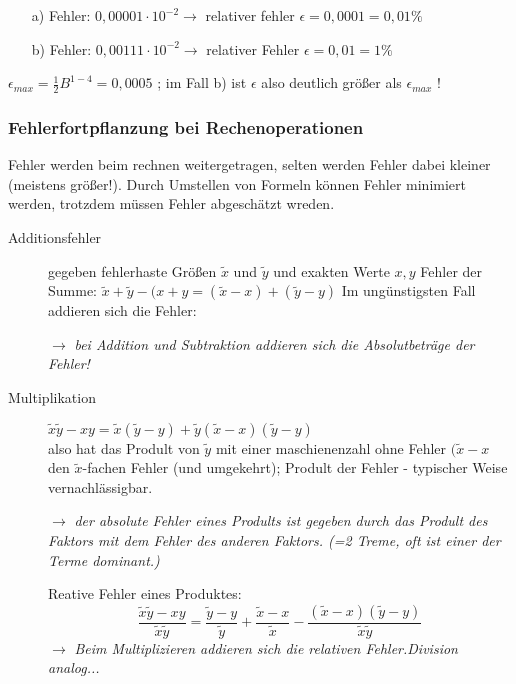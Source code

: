   \begin{enumerate}
    \item[a)] Fehler: $0,00001 \cdot 10^{-2} \rightarrow $ relativer fehler $\epsilon = 0,0001 = 0,01\% $
    \item[b)] Fehler: $0,00111 \cdot 10^{-2} \rightarrow $ relativer Fehler $\epsilon = 0,01 = 1\% $
  \end{enumerate}
  $\epsilon_{max} = \frac{1}{2} B^{1-4} = 0,0005$ ; im Fall b) ist $\epsilon$ also deutlich größer als $\epsilon_{max}$ !
  \subsubsection{Fehlerfortpflanzung bei Rechenoperationen}
  Fehler werden beim rechnen weitergetragen, selten werden Fehler dabei kleiner (meistens größer!). Durch Umstellen von Formeln können Fehler minimiert werden, trotzdem müssen Fehler abgeschätzt wreden.
  \begin{description}
    \item[Additionsfehler] gegeben fehlerhaste Größen $\tilde{x}$ und $\tilde{y}$ und exakten Werte $x, y$
      Fehler der Summe: $\tilde{x} + \tilde{y} - (x+y = (\tilde{x} - x) + (\tilde{y} - y)$
      Im ungünstigsten Fall addieren sich die Fehler:

      $\rightarrow$ \textit{bei Addition und Subtraktion addieren sich die Absolutbeträge der Fehler!}
    \item[Multiplikation]
      $\tilde{x} \tilde{y} - x y = \tilde{x}( \tilde{y} -y ) +\tilde{y} ( \tilde{x} -x)(\tilde{y} - y)$ \\
      also hat das Prodult von $\tilde{y}$ mit einer maschienenzahl ohne Fehler $(\tilde{x} - x$ den $\tilde{x}$-fachen Fehler (und umgekehrt); Prodult der Fehler - typischer Weise vernachlässigbar.

      $\rightarrow$ \textit{der absolute Fehler eines Prodults ist gegeben durch das Prodult des Faktors mit dem Fehler des anderen Faktors. (=2 Treme, oft ist einer der Terme dominant.)}

  Reative Fehler eines Produktes:
  \begin{equation}
    \frac{\tilde{x} \tilde{y} - x y}{\tilde{x} \tilde{y}} = \frac{\tilde{y} -y}{\tilde{y}} + \frac{\tilde{x} - x}{\tilde{x}} - \frac{(\tilde{x}-x)(\tilde{y} - y)}{\tilde{x} \tilde{y}}
  \end{equation}
  $\rightarrow$ \textit{Beim Multiplizieren addieren sich die relativen Fehler.Division analog...}
  \end{description}


